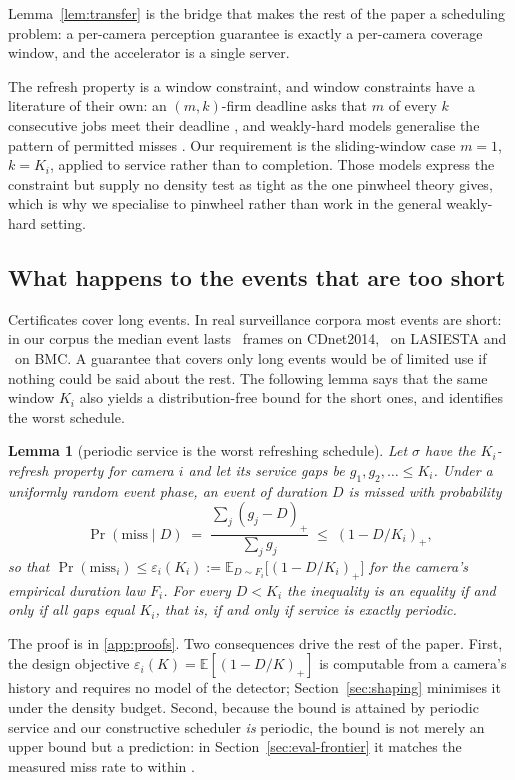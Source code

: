 \documentclass[final,5p,times,twocolumn]{elsarticle}
\newtheorem{lemma}[theorem]{Lemma}
\theoremstyle{definition}
\newcommand{\Ki}{K_i}
\newcommand{\sched}{\sigma}
\newcommand{\Dur}{D}
\newcommand{\pos}[1]{(#1)_{+}}
\begin{document}
Lemma~\ref{lem:transfer} is the bridge that makes the rest of the paper a scheduling problem: a
per-camera perception guarantee is exactly a per-camera coverage window, and the accelerator is a
single server.

The refresh property is a window constraint, and window constraints have a literature of their
own: an $(m,k)$-firm deadline asks that $m$ of every $k$ consecutive jobs meet their deadline
\cite{hamdaoui1995mkfirm}, and weakly-hard models generalise the pattern of permitted misses
\cite{bernat2001weaklyhard}. Our requirement is the sliding-window case $m=1$, $k=\Ki$,
applied to service rather than to completion. Those models express the constraint but supply
no density test as tight as the one pinwheel theory gives, which is why we specialise to
pinwheel rather than work in the general weakly-hard setting.

\subsection{What happens to the events that are too short}\label{sec:lemma2}
Certificates cover long events. In real surveillance corpora most events are short: in our corpus
the median event lasts \numMedCdnet\ frames on CDnet2014, \numMedLasiesta\ on LASIESTA and
\numMedBmc\ on BMC. A guarantee that covers only long events would be of limited use if nothing
could be said about the rest. The following lemma says that the same window $\Ki$ also yields a
distribution-free bound for the short ones, and identifies the worst schedule.

\begin{lemma}[periodic service is the worst refreshing schedule]\label{lem:worst}
Let $\sched$ have the $\Ki$-refresh property for camera $i$ and let its service gaps be
$g_1,g_2,\dots\le\Ki$. Under a uniformly random event phase, an event of duration $\Dur$ is missed
with probability
\[
\Pr(\text{miss}\mid \Dur)\;=\;\frac{\sum_j \pos{g_j-\Dur}}{\sum_j g_j}\;\le\;\pos{1-\Dur/\Ki},
\]
so that $\Pr(\text{miss}_i)\le \varepsilon_i(\Ki):=\mathbb{E}_{\Dur\sim F_i}\!\big[\pos{1-\Dur/\Ki}\big]$
for the camera's empirical duration law $F_i$. For every $\Dur<\Ki$ the inequality is an equality
if and only if all gaps equal $\Ki$, that is, if and only if service is exactly periodic.
\end{lemma}

The proof is in \ref{app:proofs}. Two consequences drive the rest of the paper. First, the design
objective $\varepsilon_i(K)=\mathbb{E}[\pos{1-\Dur/K}]$ is computable from a camera's history and
requires no model of the detector; Section~\ref{sec:shaping} minimises it under the density
budget. Second, because the bound is attained by periodic service and our constructive scheduler
\emph{is} periodic, the bound is not merely an upper bound but a prediction: in
Section~\ref{sec:eval-frontier} it matches the measured miss rate to within \numEtwoBoundErr.
\end{document}
